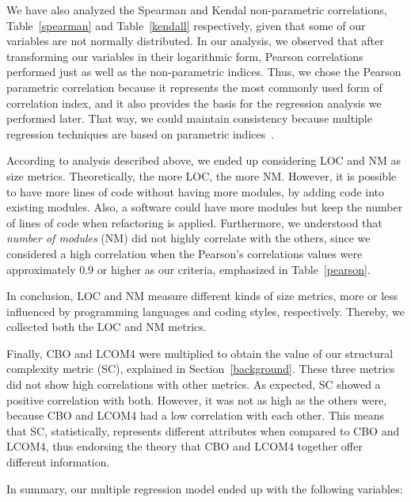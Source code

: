 \documentclass[conference]{IEEEtran}
\begin{document}
We have also analyzed the Spearman and Kendal non-parametric correlations,
Table~\ref{spearman} and Table~\ref{kendall} respectively, given that some of
our variables are not normally distributed. 
%
In our analysis, we observed that after transforming our variables in their logarithmic form, 
Pearson correlations performed just as well as the non-parametric indices.
%
Thus, we chose the Pearson parametric correlation because it represents the most 
commonly used form of correlation index, and it also provides the basis for the 
regression analysis we performed later. That way, we could maintain
consistency because multiple regression techniques are based on
parametric indices~\cite{hair2006}.

According to analysis described above, we ended up considering LOC and NM 
as size metrics. Theoretically, the more LOC, the more NM.
%
However, it is possible to have more lines of code without having more modules, by
adding code into existing modules. Also, a software could have more modules
but keep the number of lines of code when refactoring is applied.
%
Furthermore, we understood that \emph{number of modules} (NM) did not highly
correlate with the others, since we considered a high correlation when the
Pearson's correlations values were approximately 0.9 or higher as our criteria,
emphasized in Table~\ref{pearson}.

%
In conclusion, LOC and NM measure different kinds of size metrics, more or less
influenced by programming languages and coding styles, respectively.
%
Thereby, we collected both the LOC and NM metrics.

Finally, CBO and LCOM4 were multiplied to obtain the value of our structural
complexity metric (SC), explained in Section~\ref{background}.
%
These three metrics did not show high correlations with other metrics.
%
As expected, SC showed a positive correlation with both. However, it was not 
as high as the others were, because CBO and LCOM4 had a low correlation
with each other. This means that SC, statistically, represents different attributes
when compared to CBO and LCOM4, thus endorsing  the theory that CBO and LCOM4 together
offer different information. 

In summary, our multiple regression model ended up with the following variables:
\end{document}
